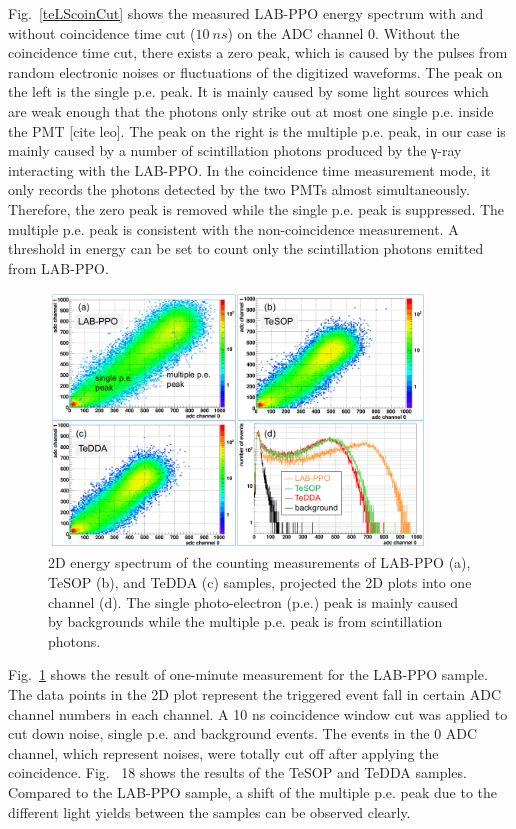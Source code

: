Fig.~\ref{teLScoinCut} shows the measured LAB-PPO energy spectrum with and without coincidence time cut ($10~ns$) on the ADC channel 0.  Without the coincidence time cut, there exists a zero peak, which is caused by the pulses from random electronic noises or fluctuations of the digitized waveforms. The peak on the left is the single p.e. peak. It is mainly caused by some light sources which are weak enough that the photons only strike out at most one single p.e. inside the PMT [cite leo].  The peak on the right is the multiple p.e. peak, in our case is mainly caused by a number of scintillation photons produced by the γ-ray interacting with the LAB-PPO. In the coincidence time measurement mode, it only records the photons detected by the two PMTs almost simultaneously. Therefore, the zero peak is removed while the single p.e. peak is suppressed. The multiple p.e. peak is consistent with the non-coincidence measurement. A threshold in energy can be set to count only the scintillation photons emitted from LAB-PPO. 


\begin{figure}[htbp]
	\centering	
	\includegraphics[width=10cm]{TeLS_2Denergy.png}
	\caption{ 2D energy spectrum of the counting measurements of LAB-PPO (a), TeSOP (b), and TeDDA (c) samples, projected the 2D plots into one channel (d). The single photo-electron (p.e.) peak is mainly caused by backgrounds while the multiple p.e. peak is from scintillation photons.}
	\label{teLSresults}
\end{figure}

Fig.~\ref{teLSresults} shows the result of one-minute measurement for the LAB-PPO sample. The data points in the 2D plot represent the triggered event fall in certain ADC channel numbers in each channel. A 10 ns coincidence window cut was applied to cut down noise, single p.e. and background events. The events in the 0 ADC channel, which represent noises, were totally cut off after applying the coincidence. Fig.~ 18 shows the results of the TeSOP and TeDDA samples.  Compared to the LAB-PPO sample, a shift of the multiple p.e. peak due to the different light yields between the samples can be observed clearly.

